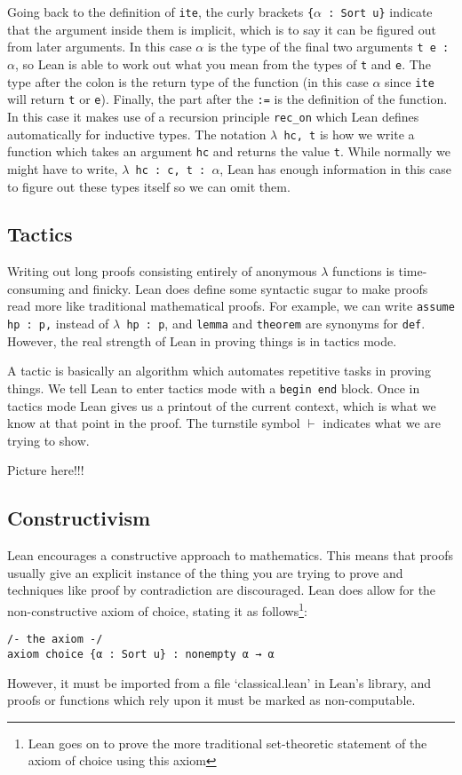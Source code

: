 \documentclass{article}
\renewcommand{\a}{\alpha}
\newcommand{\ct}{\texttt}
\begin{document}
Going back to the definition of \ct{ite}, the curly brackets \ct{\{$\a$ : Sort u\}} indicate that the argument inside them is implicit, which is to say it can be figured out from later arguments.
In this case $\a$ is the type of the final two arguments \ct{t e : $\a$}, so Lean is able to work out what you mean from the types of \ct{t} and \ct{e}.
The type after the colon is the return type of the function (in this case \ct{$\a$} since \ct{ite} will return \ct{t} or \ct{e}).
Finally, the part after the \ct{:=} is the definition of the function. 
In this case it makes use of a recursion principle \ct{rec\_on} which Lean defines automatically for inductive types.
The notation \ct{$\lambda$ hc, t} is how we write a function which takes an argument \ct{hc} and returns the value \ct{t}.
While normally we might have to write, \ct{$\lambda$ hc : c, t : $\a$}, Lean has enough information in this case to figure out these types itself so we can omit them.


\subsection{Tactics}
Writing out long proofs consisting entirely of anonymous $\lambda$ functions is time-consuming and finicky.
Lean does define some syntactic sugar to make proofs read more like traditional mathematical proofs.
For example, we can write \ct{assume hp : p,} instead of \ct{$\lambda$ hp : p}, and \ct{lemma} and \ct{theorem} are synonyms for \ct{def}.
However, the real strength of Lean in proving things is in tactics mode.

A tactic is basically an algorithm which automates repetitive tasks in proving things.
We tell Lean to enter tactics mode with a \ct{begin end} block.
Once in tactics mode Lean gives us a printout of the current context, which is what we know at that point in the proof. 
The turnstile symbol $\vdash$ indicates what we are trying to show.

Picture here!!!



\subsection{Constructivism}
Lean encourages a constructive approach to mathematics. 
This means that proofs usually give an explicit instance of the thing you are trying to prove and techniques like proof by contradiction are discouraged.
Lean does allow for the non-constructive axiom of choice, stating it as follows\footnote{Lean goes on to prove the more traditional set-theoretic statement of the axiom of choice using this axiom}: 
\begin{lstlisting}
/- the axiom -/
axiom choice {α : Sort u} : nonempty α → α
\end{lstlisting}
However, it must be imported from a file `classical.lean' in Lean's library, and proofs or functions which rely upon it must be marked as non-computable.
\end{document}
